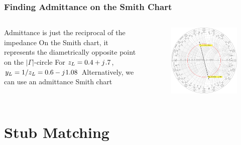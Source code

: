 \documentclass[10pt, compress]{beamer}
\renewcommand{\j}{{j}\mkern1mu} %
\begin{document}
\begin{frame}
    \frametitle{Finding Admittance on the Smith Chart}
    \begin{columns}[T]
        \begin{column}[]{.4\textwidth}
            \begin{outline}
                \1 Admittance is just the reciprocal of the impedance
                \1 On the Smith chart, it represents the diametrically opposite point on the $|\Gamma|$-circle
                \1 For $z_L = 0.4 + \j .7$, $y_L = 1/z_L = 0.6 - \j 1.08 $
                \1 Alternatively, we can use an admittance Smith chart
            \end{outline} 
        \end{column}
        \begin{column}[]{.6\textwidth}
            \begin{figure}[T!]
                \centering
                \includegraphics[width=.9\textwidth]{smith example admittance.pdf}
            \end{figure}
        \end{column}
    \end{columns}



\end{frame}



\section{Stub Matching}
\end{document}
